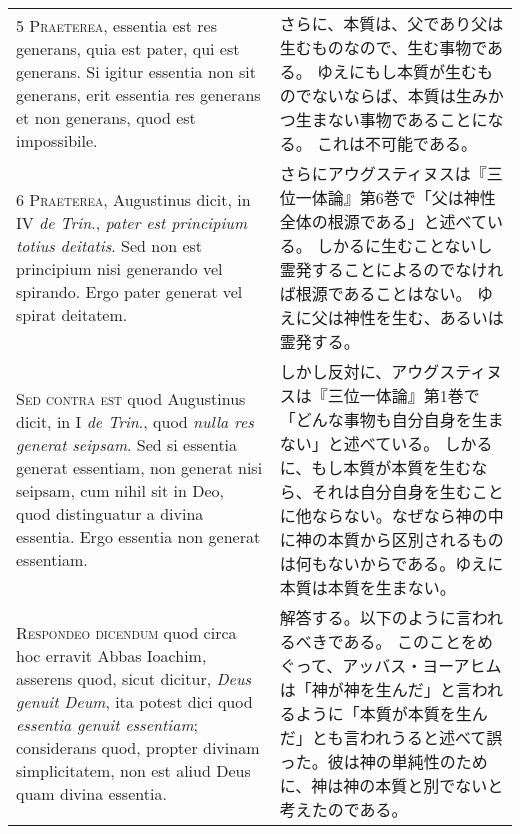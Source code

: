 \documentclass[10pt]{jsarticle} %
\begin{document}
\begin{longtable}{p{21em}p{21em}}
\\

5 \textsc{Praeterea}, essentia est res generans, quia est pater, qui est
generans. Si igitur essentia non sit generans, erit essentia res generans et
non generans, quod est impossibile.


&

さらに、本質は、父であり父は生むものなので、生む事物である。
ゆえにもし本質が生むものでないならば、本質は生みかつ生まない事物であることになる。
これは不可能である。

\\

6 \textsc{Praeterea}, Augustinus dicit, in IV \textit{de Trin}., \textit{pater
est principium totius deitatis}. Sed non est principium nisi generando vel
spirando. Ergo pater generat vel spirat deitatem.


&

さらにアウグスティヌスは『三位一体論』第6巻で「父は神性全体の根源である」と述べている。
しかるに生むことないし霊発することによるのでなければ根源であることはない。
ゆえに父は神性を生む、あるいは霊発する。


\\

\textsc{Sed contra est} quod Augustinus dicit, in I \textit{de Trin}., quod
\textit{nulla res generat seipsam}. Sed si essentia generat essentiam, non
generat nisi seipsam, cum nihil sit in Deo, quod distinguatur a divina
essentia. Ergo essentia non generat essentiam.


&

しかし反対に、アウグスティヌスは『三位一体論』第1巻で「どんな事物も自分自身を生まない」と述べている。
しかるに、もし本質が本質を生むなら、それは自分自身を生むことに他ならない。なぜなら神の中に神の本質から区別されるものは何もないからである。ゆえに本質は本質を生まない。

\\


\textsc{Respondeo dicendum} quod circa hoc erravit Abbas Ioachim, asserens quod, sicut
dicitur, \textit{Deus genuit Deum}, ita potest dici quod \textit{essentia genuit essentiam};
considerans quod, propter divinam simplicitatem, non est aliud Deus quam divina
essentia. 


&

解答する。以下のように言われるべきである。
このことをめぐって、アッバス・ヨーアヒムは「神が神を生んだ」と言われるように「本質が本質を生んだ」とも言われうると述べて誤った。彼は神の単純性のために、神は神の本質と別でないと考えたのである。


\end{longtable}
\end{document}
